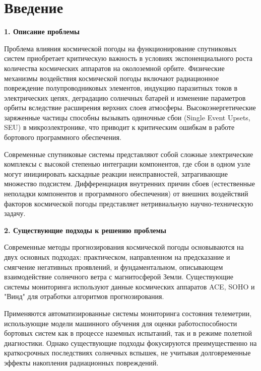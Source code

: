 \chapter*{Введение}

\textbf{1. Описание проблемы}

Проблема влияния космической погоды на функционирование спутниковых систем 
приобретает критическую важность в условиях экспоненциального роста количества 
космических аппаратов на околоземной орбите\cite{green_2017_impact}\cite{geomag_handbook}. Физические механизмы воздействия 
космической погоды включают радиационное повреждение полупроводниковых элементов, 
индукцию паразитных токов в электрических цепях, деградацию солнечных батарей и 
изменение параметров орбиты вследствие расширения верхних слоев атмосферы\cite{green_2017_impact}\cite{geomag_handbook}. 
Высокоэнергетические заряженные частицы способны вызывать одиночные сбои (Single 
Event Upsets, SEU) в микроэлектронике, что приводит к критическим ошибкам в работе 
бортового программного обеспечения.

Современные спутниковые системы представляют собой сложные электрические комплексы 
с высокой степенью интеграции компонентов, где сбои в одном узле могут инициировать 
каскадные реакции неисправностей, затрагивающие множество подсистем. Дифференциация 
внутренних причин сбоев (естественные неполадки компонентов и программного обеспечения) 
от внешних воздействий факторов космической погоды представляет нетривиальную 
научно-техническую задачу\cite{geomag_handbook}.

\textbf{2. Существующие подходы к решению проблемы}

Современные методы прогнозирования космической погоды основываются на двух основных 
подходах: практическом, направленном на предсказание и смягчение негативных проявлений, 
и фундаментальном, описывающем взаимодействие солнечного ветра с магнитосферой Земли\cite{geomag_handbook}. 
Существующие системы мониторинга используют данные космических аппаратов ACE, SOHO и 
"Винд" для отработки алгоритмов прогнозирования\cite{geomag_handbook}.

Применяются автоматизированные системы мониторинга состояния телеметрии, использующие 
модели машинного обучения для оценки работоспособности бортовых систем как в процессе 
наземных испытаний, так и в режиме полетной диагностики. Однако существующие подходы 
фокусируются преимущественно на краткосрочных последствиях солнечных вспышек, не 
учитывая долговременные эффекты накопления радиационных повреждений\cite{geomag_handbook}.

